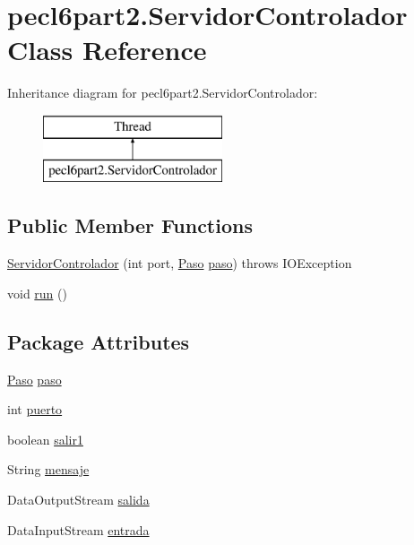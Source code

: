 \hypertarget{classpecl6part2_1_1_servidor_controlador}{}\section{pecl6part2.\+Servidor\+Controlador Class Reference}
\label{classpecl6part2_1_1_servidor_controlador}
Inheritance diagram for pecl6part2.\+Servidor\+Controlador\+:\begin{figure}[H]
\begin{center}
\leavevmode
\includegraphics[height=2.000000cm]{classpecl6part2_1_1_servidor_controlador}
\end{center}
\end{figure}
\subsection*{Public Member Functions}
\begin{DoxyCompactItemize}
\item 
\mbox{\hyperlink{classpecl6part2_1_1_servidor_controlador_a6f49d3d66d33c0f6dc5e7dab2af6766b}{Servidor\+Controlador}} (int port, \mbox{\hyperlink{classpecl6part2_1_1_paso}{Paso}} \mbox{\hyperlink{classpecl6part2_1_1_servidor_controlador_a3d1fc8f640e9e8271b06bf8ae9ea1176}{paso}})  throws I\+O\+Exception 
\item 
void \mbox{\hyperlink{classpecl6part2_1_1_servidor_controlador_a884b191679d749a264476c350c815d75}{run}} ()
\end{DoxyCompactItemize}
\subsection*{Package Attributes}
\begin{DoxyCompactItemize}
\item 
\mbox{\hyperlink{classpecl6part2_1_1_paso}{Paso}} \mbox{\hyperlink{classpecl6part2_1_1_servidor_controlador_a3d1fc8f640e9e8271b06bf8ae9ea1176}{paso}}
\item 
int \mbox{\hyperlink{classpecl6part2_1_1_servidor_controlador_a685d8d2e3aba27e77af577046faadabe}{puerto}}
\item 
boolean \mbox{\hyperlink{classpecl6part2_1_1_servidor_controlador_a1721c97ac463f940af370521ac8f78db}{salir1}}
\item 
String \mbox{\hyperlink{classpecl6part2_1_1_servidor_controlador_ac8db190b3104ab20a03976a5411f3bd6}{mensaje}}
\item 
Data\+Output\+Stream \mbox{\hyperlink{classpecl6part2_1_1_servidor_controlador_a1a4f0c67b54fa5aa781c1ceafb347e47}{salida}}
\item 
Data\+Input\+Stream \mbox{\hyperlink{classpecl6part2_1_1_servidor_controlador_a38528daafe711028fb1bf830801923ba}{entrada}}
\end{DoxyCompactItemize}
